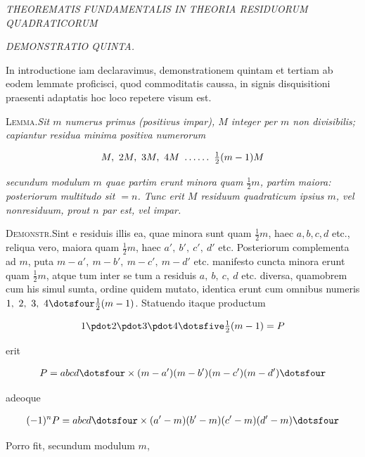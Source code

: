 \begin{center}
\textit{THEOREMATIS FUNDAMENTALIS IN THEORIA RESIDUORUM QUADRATICORUM}\par
\textit{DEMONSTRATIO QUINTA.}
\end{center}


In introductione iam declaravimus, demonstrationem quintam et tertiam ab eodem lemmate proficisci, quod commoditatis caussa, in signis disquisitioni praesenti adaptatis hoc loco repetere visum est.

\textsc{Lemma.}\quad \textit{Sit $m$ numerus primus (positivus impar), $M$ integer per $m$ non divi}\textit{sibilis; capiantur residua minima positiva numerorum}

\[
\begin{aligned}
M,\ 2M,\ 3M,\ 4M\ \mathinner{.\,.\,.\,.\,.\,.}\ \tfrac12(m-1)M
\end{aligned}
\]

\textit{secundum modulum $m$ quae partim erunt minora quam $\tfrac12m$, partim maiora: poste}\textit{riorum multitudo sit $=n$. Tunc erit $M$ residuum quadraticum ipsius $m$, vel non}\textit{residuum, prout $n$ par est, vel impar.}

\textsc{Demonstr.}\quad Sint e residuis illis ea, quae minora sunt quam $\tfrac12m$, haec $a,b,c,d$ etc., reliqua vero, maiora quam $\tfrac12m$, haec $a',\ b',\ c',\ d'$ etc. Posteriorum complementa ad $m$, puta $m-a',\ m-b',\ m-c',\ m-d'$ etc. manifesto cuncta minora erunt quam $\tfrac12m$, atque tum inter se tum a residuis $a,\ b,\ c,\ d$ etc. diversa, quamobrem cum his simul sumta, ordine quidem mutato, identica erunt cum omnibus numeris $1,\ 2,\ 3,\ 4\dotsfour\tfrac12(m-1)$. Statuendo itaque productum

\[
\begin{aligned}
1\pdot2\pdot3\pdot4\dotsfive\tfrac12(m-1)=P
\end{aligned}
\]

erit

\[
\begin{aligned}
P=abcd\dotsfour\times(m-a')(m-b')(m-c')(m-d')\dotsfour
\end{aligned}
\]

adeoque

\[
\begin{aligned}
(-1)^nP=abcd\dotsfour\times(a'-m)(b'-m)(c'-m)(d'-m)\dotsfour
\end{aligned}
\]

Porro fit, secundum modulum $m$,

